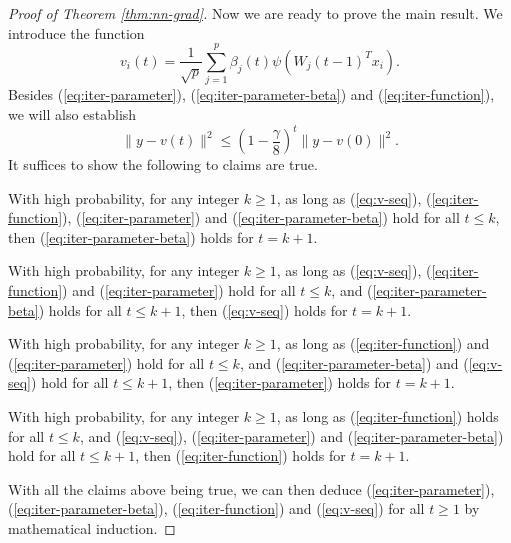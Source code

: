 \begin{proof}[Proof of Theorem \ref{thm:nn-grad}]
Now we are ready to prove the main result. We introduce the function
$$v_i(t)=\frac{1}{\sqrt{p}}\sum_{j=1}^p\beta_j(t)\psi(W_j(t-1)^Tx_i).$$
Besides (\ref{eq:iter-parameter}), (\ref{eq:iter-parameter-beta}) and (\ref{eq:iter-function}), we will also establish
\begin{equation}
\|y-v(t)\|^2 \leq \left(1-\frac{\gamma}{8}\right)^t\|y-v(0)\|^2. \label{eq:v-seq}
\end{equation}
It suffices to show the following to claims are true.
\begin{thm1}
With high probability, for any integer $k\geq 1$, as long as (\ref{eq:v-seq}), (\ref{eq:iter-function}), (\ref{eq:iter-parameter}) and (\ref{eq:iter-parameter-beta}) hold for all $t\leq k$, then (\ref{eq:iter-parameter-beta}) holds for $t=k+1$.
\end{thm1}
\begin{thm2}
With high probability, for any integer $k\geq 1$, as long as (\ref{eq:v-seq}), (\ref{eq:iter-function}) and (\ref{eq:iter-parameter}) hold for all $t\leq k$, and (\ref{eq:iter-parameter-beta}) holds for all $t\leq k+1$, then (\ref{eq:v-seq}) holds for $t=k+1$.
\end{thm2}
\begin{thm3}
With high probability, for any integer $k\geq 1$, as long as (\ref{eq:iter-function}) and (\ref{eq:iter-parameter}) hold for all $t\leq k$, and (\ref{eq:iter-parameter-beta}) and (\ref{eq:v-seq}) hold for all $t\leq k+1$, then (\ref{eq:iter-parameter}) holds for $t=k+1$.
\end{thm3}
\begin{thm4}
With high probability, for any integer $k\geq 1$, as long as (\ref{eq:iter-function}) holds for all $t\leq k$, and (\ref{eq:v-seq}), (\ref{eq:iter-parameter}) and (\ref{eq:iter-parameter-beta}) hold for all $t\leq k+1$, then (\ref{eq:iter-function}) holds for $t=k+1$.
\end{thm4}
\noindent With all the claims above being true, we can then deduce (\ref{eq:iter-parameter}), (\ref{eq:iter-parameter-beta}), (\ref{eq:iter-function}) and (\ref{eq:v-seq}) for all $t\geq 1$ by mathematical induction.


\end{proof}
